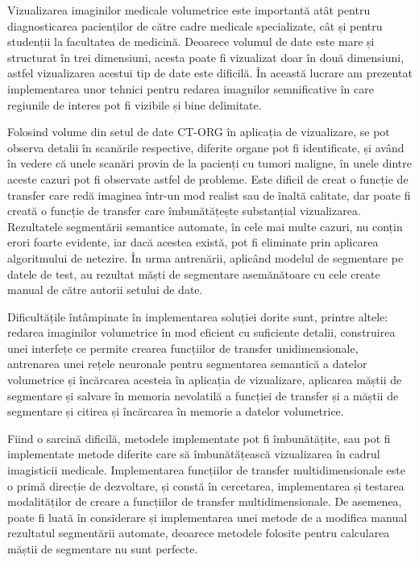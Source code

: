 Vizualizarea imaginilor medicale volumetrice este importantă atât pentru diagnosticarea pacienților de către cadre medicale specializate, cât și pentru studenții la facultatea de medicină. Deoarece volumul de date este mare și structurat în trei dimensiuni, acesta poate fi vizualizat doar în două dimensiuni, astfel vizualizarea acestui tip de date este dificilă. În această lucrare am prezentat implementarea unor tehnici pentru redarea imagnilor semnificative în care regiunile de interes pot fi vizibile și bine delimitate.

Folosind volume din setul de date CT-ORG în aplicația de vizualizare, se pot observa detalii în scanările respective, diferite organe pot fi identificate, și având în vedere că unele scanări provin de la pacienți cu tumori maligne, în unele dintre aceste cazuri pot fi observate astfel de probleme. Este dificil de creat o funcție de transfer care redă imaginea într-un mod realist sau de înaltă calitate, dar poate fi creată o funcție de transfer care îmbunătățește substanțial vizualizarea. Rezultatele segmentării semantice automate, în cele mai multe cazuri, nu conțin erori foarte evidente, iar dacă acestea există, pot fi eliminate prin aplicarea algoritmului de netezire. În urma antrenării, aplicând modelul de segmentare pe datele de test, au rezultat măști de segmentare asemănătoare cu cele create manual de către autorii setului de date.

Dificultățile întâmpinate în implementarea soluției dorite sunt, printre altele: redarea imaginilor volumetrice în mod eficient cu suficiente detalii, construirea unei interfețe ce permite crearea funcțiilor de transfer unidimensionale, antrenarea unei rețele neuronale pentru segmentarea semantică a datelor volumetrice și încărcarea acesteia în aplicația de vizualizare, aplicarea măștii de segmentare și salvare în memoria nevolatilă a funcției de transfer și a măștii de segmentare și citirea și încărcarea în memorie a datelor volumetrice.

Fiind o sarcină dificilă, metodele implementate pot fi îmbunătățite, sau pot fi implementate metode diferite care să îmbunătățească vizualizarea în cadrul imagisticii medicale. Implementarea funcțiilor de transfer multidimensionale este o primă direcție de dezvoltare, și constă în cercetarea, implementarea și testarea modalităților de creare a funcțiilor de transfer multidimensionale. De asemenea, poate fi luată în considerare și implementarea unei metode de a modifica manual rezultatul segmentării automate, deoarece metodele folosite pentru calcularea măștii de segmentare nu sunt perfecte.
